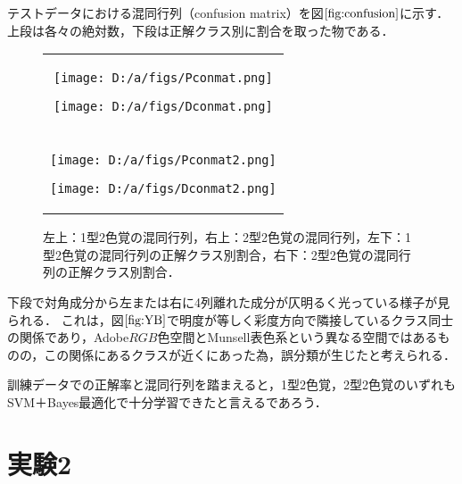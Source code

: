 \documentclass[uplatex,paper=a4,fontsize=4.0truemm,jafontsize=4.0truemm,head_space=30.0truemm,foot_space=30.0truemm,baselineskip=8.0truemm,line_length=40zw,gutter=25.0truemm,oneside,openany,fleqn,hanging_panctuation,open_bracket_pos=nibu_tentsuki,dvipdfmx,jis2004,book,titlepage]{jlreq}
\theoremstyle{mystyle}
\newcommand{\captiondot}[1]{\caption{#1．}}
\newcommand{\mathdisplaystyle}[1]{\(\displaystyle{#1}\)}
\newcommand{\Reference}[1]{\mathdisplaystyle{\ref{#1}}}
\begin{document}
				テストデータにおける混同行列（confusion matrix）を図\Reference{fig:confusion}に示す．
				上段は各々の絶対数，下段は正解クラス別に割合を取った物である．
				\begin{figure}[tbp]
					\centering
					\begin{tabular}{c}
						\begin{minipage}{0.5\linewidth}
							\centering
							\texttt{[image: D:/a/figs/Pconmat.png]}
						\end{minipage}
						\begin{minipage}{0.5\linewidth}
							\centering
							\texttt{[image: D:/a/figs/Dconmat.png]}
						\end{minipage} \\
						\begin{minipage}{0.06\linewidth}
							\vspace{10truemm}
						\end{minipage} \\
						\begin{minipage}{0.5\linewidth}
							\centering
							\texttt{[image: D:/a/figs/Pconmat2.png]}
						\end{minipage}
						\begin{minipage}{0.5\linewidth}
							\centering
							\texttt{[image: D:/a/figs/Dconmat2.png]}
						\end{minipage}
					\end{tabular}
					\captiondot{左上：1型2色覚の混同行列，右上：2型2色覚の混同行列，左下：1型2色覚の混同行列の正解クラス別割合，右下：2型2色覚の混同行列の正解クラス別割合}\label{fig:confusion}
				\end{figure}
				下段で対角成分から左または右に4列離れた成分が仄明るく光っている様子が見られる．
				これは，図\Reference{fig:YB}で明度が等しく彩度方向で隣接しているクラス同士の関係であり，Adobe\mathdisplaystyle{RGB}色空間とMunsell表色系という異なる空間ではあるものの，この関係にあるクラスが近くにあった為，誤分類が生じたと考えられる．

				訓練データでの正解率と混同行列を踏まえると，1型2色覚，2型2色覚のいずれもSVM＋Bayes最適化で十分学習できたと言えるであろう．
		\section{実験2}
\end{document}
